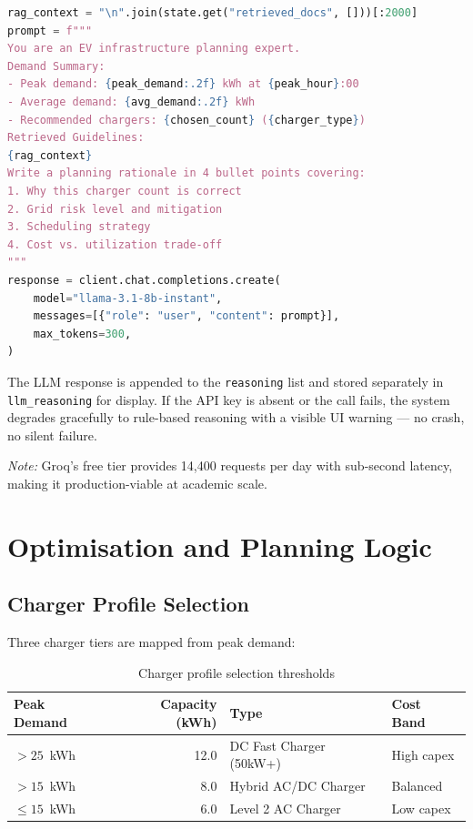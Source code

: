 \documentclass[12pt,a4paper]{article}
\begin{document}
\begin{lstlisting}[language=Python,caption={LLM prompt construction in \texttt{reasoning\_node}}]
rag_context = "\n".join(state.get("retrieved_docs", []))[:2000]
prompt = f"""
You are an EV infrastructure planning expert.
Demand Summary:
- Peak demand: {peak_demand:.2f} kWh at {peak_hour}:00
- Average demand: {avg_demand:.2f} kWh
- Recommended chargers: {chosen_count} ({charger_type})
Retrieved Guidelines:
{rag_context}
Write a planning rationale in 4 bullet points covering:
1. Why this charger count is correct
2. Grid risk level and mitigation
3. Scheduling strategy
4. Cost vs. utilization trade-off
"""
response = client.chat.completions.create(
    model="llama-3.1-8b-instant",
    messages=[{"role": "user", "content": prompt}],
    max_tokens=300,
)
\end{lstlisting}

The LLM response is appended to the \texttt{reasoning} list and stored separately
in \texttt{llm\_reasoning} for display. If the API key is absent or the call
fails, the system degrades gracefully to rule-based reasoning with a visible UI
warning — no crash, no silent failure.

\textit{Note:} Groq's free tier provides 14{,}400 requests per day with sub-second
latency, making it production-viable at academic scale.

\section{Optimisation and Planning Logic}
\label{sec:optimisation}

\subsection{Charger Profile Selection}

Three charger tiers are mapped from peak demand:

\begin{table}[H]
\centering
\caption{Charger profile selection thresholds}
\begin{tabular}{lrll}
  \toprule
  \textbf{Peak Demand} & \textbf{Capacity (kWh)} & \textbf{Type} & \textbf{Cost Band} \\
  \midrule
  $>25$~kWh   & 12.0 & DC Fast Charger (50kW+)  & High capex \\
  $>15$~kWh   & 8.0  & Hybrid AC/DC Charger      & Balanced \\
  $\leq 15$~kWh & 6.0 & Level 2 AC Charger       & Low capex \\
  \bottomrule
\end{tabular}
\end{table}
\end{document}
